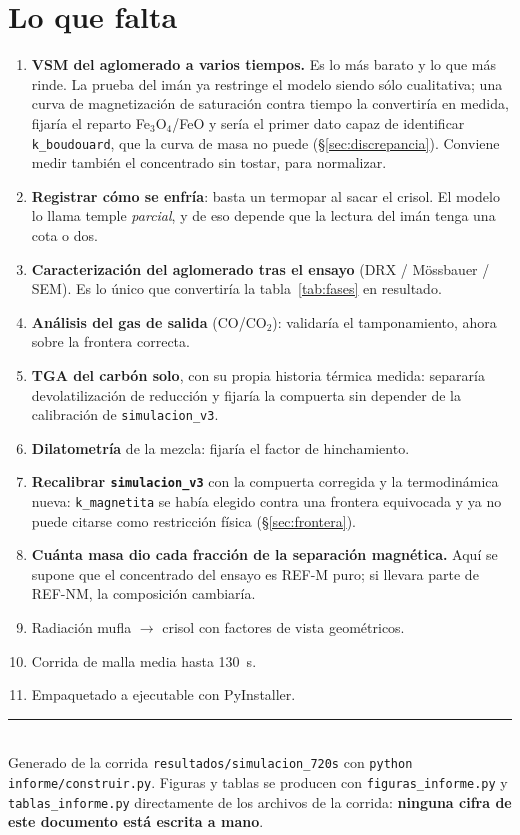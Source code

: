 \documentclass[11pt,a4paper]{article}
\begin{document}
\section{Lo que falta}

\begin{enumerate}[leftmargin=*,itemsep=2pt]
\item \textbf{VSM del aglomerado a varios tiempos.} Es lo más barato y lo que
más rinde. La prueba del imán ya restringe el modelo siendo sólo cualitativa;
una curva de magnetización de saturación contra tiempo la convertiría en medida,
fijaría el reparto Fe$_3$O$_4$/FeO y sería el primer dato capaz de identificar
\texttt{k\_boudouard}, que la curva de masa no puede (\S\ref{sec:discrepancia}).
Conviene medir también el concentrado sin tostar, para normalizar.
\item \textbf{Registrar cómo se enfría}: basta un termopar al sacar el crisol.
El modelo lo llama temple \emph{parcial}, y de eso depende que la lectura del
imán tenga una cota o dos.
\item \textbf{Caracterización del aglomerado tras el ensayo} (DRX / Mössbauer /
SEM). Es lo único que convertiría la tabla~\ref{tab:fases} en resultado.
\item \textbf{Análisis del gas de salida} (CO/CO$_2$): validaría el
tamponamiento, ahora sobre la frontera correcta.
\item \textbf{TGA del carbón solo}, con su propia historia térmica medida:
separaría devolatilización de reducción y fijaría la compuerta sin depender de la
calibración de \texttt{simulacion\_v3}.
\item \textbf{Dilatometría} de la mezcla: fijaría el factor de hinchamiento.
\item \textbf{Recalibrar \texttt{simulacion\_v3}} con la compuerta corregida y la
termodinámica nueva: \texttt{k\_magnetita} se había elegido contra una frontera
equivocada y ya no puede citarse como restricción física (\S\ref{sec:frontera}).
\item \textbf{Cuánta masa dio cada fracción de la separación magnética.} Aquí se
supone que el concentrado del ensayo es REF-M puro; si llevara parte de REF-NM,
la composición cambiaría.
\item Radiación mufla $\rightarrow$ crisol con factores de vista geométricos.
\item Corrida de malla media hasta \SI{130}{\second}.
\item Empaquetado a ejecutable con PyInstaller.
\end{enumerate}

\vfill
\noindent\rule{\textwidth}{0.4pt}\\
\footnotesize
Generado de la corrida \texttt{resultados/simulacion\_720s} con
\texttt{python informe/construir.py}. Figuras y tablas se producen con
\texttt{figuras\_informe.py} y \texttt{tablas\_informe.py} directamente de los
archivos de la corrida: \textbf{ninguna cifra de este documento está escrita a
mano}.
\end{document}
